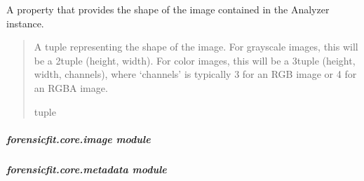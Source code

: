 \documentclass[letterpaper,10pt,english]{sphinxmanual}
\begin{document}
\begin{fulllineitems}
\begin{fulllineitems}
\end{fulllineitems}


\begin{fulllineitems}
\label{\detokenize{forensicfit.core.analyzer:forensicfit.core.analyzer.Analyzer.shape}}
\pysigstartsignatures
{}
\pysigstopsignatures
\sphinxAtStartPar
A property that provides the shape of the image contained in the Analyzer instance.
\begin{quote}\begin{description}
\sphinxAtStartPar
A tuple representing the shape of the image. For grayscale images,
this will be a 2\sphinxhyphen{}tuple (height, width). For color images, this
will be a 3\sphinxhyphen{}tuple (height, width, channels), where ‘channels’
is typically 3 for an RGB image or 4 for an RGBA image.

\sphinxAtStartPar
tuple

\end{description}\end{quote}

\end{fulllineitems}


\end{fulllineitems}


\sphinxstepscope


\subparagraph{forensicfit.core.image module}
\label{\detokenize{forensicfit.core.image:module-forensicfit.core.image}}\label{\detokenize{forensicfit.core.image:forensicfit-core-image-module}}\label{\detokenize{forensicfit.core.image::doc}}
\sphinxstepscope


\subparagraph{forensicfit.core.metadata module}
\label{\detokenize{forensicfit.core.metadata:module-forensicfit.core.metadata}}\label{\detokenize{forensicfit.core.metadata:forensicfit-core-metadata-module}}\label{\detokenize{forensicfit.core.metadata::doc}}
\end{document}
